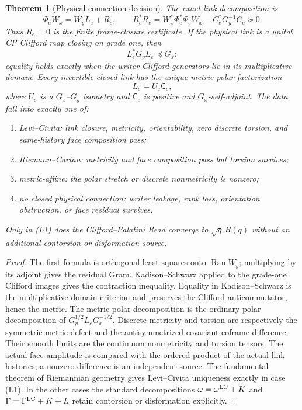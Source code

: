 \documentclass[11pt]{article}
\newtheorem{theorem}{Theorem}[section]
\theoremstyle{definition}
\theoremstyle{remark}
\newcommand{\Ran}{\operatorname{Ran}}
\begin{document}
\begin{theorem}[Physical connection decision]
\label{thm:physical-connection-master}
The exact link decomposition is
\[
 \boxed{\Phi_eW_x=W_yL_e+R_e,\qquad
 R_e^*R_e=W_x^*\Phi_e^*\Phi_eW_x-C_e^*G_y^{-1}C_e\succeq0.}
\]
Thus $R_e=0$ is the finite frame-closure certificate.  If the physical link is
a unital CP Clifford map closing on grade one, then
\[
 L_e^*G_yL_e\preceq G_x;
\]
equality holds exactly when the writer Clifford generators lie in its
multiplicative domain.  Every invertible closed link has the unique metric polar
factorization
\[
 \boxed{L_e=U_e\mathsf C_e,}
\]
where $U_e$ is a $G_x$--$G_y$ isometry and $\mathsf C_e$ is positive and
$G_x$-self-adjoint.  The data fall into exactly one of:
\begin{enumerate}[label=\textup{(L\arabic*)},leftmargin=3em]
\item Levi--Civita: link closure, metricity, orientability, zero discrete
      torsion, and same-history face composition pass;
\item Riemann--Cartan: metricity and face composition pass but torsion survives;
\item metric-affine: the polar stretch or discrete nonmetricity is nonzero;
\item no closed physical connection: writer leakage, rank loss, orientation
      obstruction, or face residual survives.
\end{enumerate}
Only in \textup{(L1)} does the Clifford--Palatini Read converge to
$\sqrt q\,R(q)$ without an additional contorsion or disformation source.
\end{theorem}

\begin{proof}
The first formula is orthogonal least squares onto $\Ran W_y$; multiplying by
its adjoint gives the residual Gram.  Kadison--Schwarz applied to the grade-one
Clifford images gives the contraction inequality.  Equality in
Kadison--Schwarz is the multiplicative-domain criterion and preserves the
Clifford anticommutator, hence the metric.  The metric polar decomposition is
the ordinary polar decomposition of
$G_y^{1/2}L_eG_x^{-1/2}$.  Discrete metricity and torsion are respectively the
symmetric metric defect and the antisymmetrized covariant coframe difference.
Their smooth limits are the continuum nonmetricity and torsion tensors.  The
actual face amplitude is compared with the ordered product of the actual link
histories; a nonzero difference is an independent source.  The fundamental
theorem of Riemannian geometry gives Levi--Civita uniqueness exactly in case
\textup{(L1)}.  In the other cases the standard decompositions
$\omega=\omega^{\rm LC}+K$ and
$\Gamma=\Gamma^{\rm LC}+K+L$ retain contorsion or disformation explicitly.
\end{proof}
\end{document}
